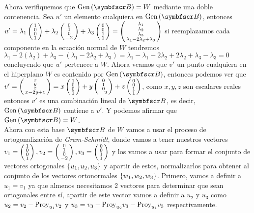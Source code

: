     Ahora verifiquemos que \(\pgen{\fb} = W\) mediante una doble contenencia. 
    Sea \(u'\) un elemento cualquiera en \(\pgen{\fb}\), entonces 
    \(
        u'
        = 
        \lambda_1 
        \fsmvec{1,0,0,1}
        +
        \lambda_2
        \fsmvec{0,1,0,-2}
        +
        \lambda_3
        \fsmvec{0,0,1,1}
        =
        \fsmvec{
            \lambda_1,
            \lambda_2,
            \lambda_3,
            \lambda_1 - 2\lambda_2 + \lambda_3
        }
    \)
    si reemplazamos cada componente en la ecuación normal de \(W\) tendremos
    \(
        \lambda_1 -2(\lambda_2) + \lambda_3 - (\lambda_1 -2\lambda_2 + \lambda_3) 
        =
        \lambda_1 - \lambda_1 -2\lambda_2 +2\lambda_2 + \lambda_3 - \lambda_3
        =
        0
    \)
    concluyendo que \(u'\) pertenece a \(W\).
    Ahora veamos que \(v'\) un punto cualquiera en el hiperplano \(W\) es contenido por \(\pgen{\fb}\), entonces podemos ver que
    \(v' = \fsmvec{x,y,z,x -2y + z} = x \fsmvec{1,0,0,1} + y\fsmvec{0,1,0,-2} + z\fsmvec{0,0,1,1}\), como \(x, y, z\) son 
    escalares reales entonces \(v'\) es una combinación lineal de \(\fb\), es decir, \(\pgen{\fb}\) contiene a \(v'\).
    Y podemos afirmar que \(\pgen{\fb} = W\).
    \\
    Ahora con esta base \(\fb\) de \(W\) vamos a usar el proceso de ortogonalización de \emph{Gram-Schmidt}, donde 
    vamos a tener nuestros vectores 
    \(
        v_1 = \fsmvec{1,0,0,1}, 
        v_2 = \fsmvec{0,1,0,-2},
        v_3 = \fsmvec{0,0,1,1}
    \)
    y los vamos a usar para formar el conjunto de vectores ortogonales \(\left\{ u_1, u_2, u_3 \right\}\) y apartir de estos, normalizarlos para 
    obtener al conjunto de los vectores ortonormales \(\left\{ w_1, w_2, w_3 \right\}\).
    Primero, vamos a definir a \(u_1 = v_1\) ya que almenos necesitamos 2 vectores para determinar que sean ortogonales entre sí,
    apartir de este vector vamos a definir a \(u_2\) y \(u_3\) como \(u_2 = v_2 - \text{Proy}_{u_1} v_2\) y \(u_3 = v_3 - \text{Proy}_{u_2} v_3 - \text{Proy}_{u_1} v_3\) respectivamente.
